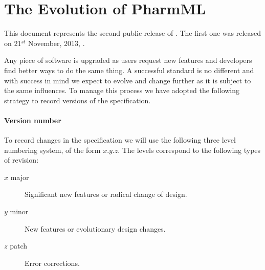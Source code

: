

\section{The Evolution of PharmML}
	
This document represents the second public release of \pharmml. The first one was released  
on 21$^{st}$ November, 2013, \cite{Pharmml_021}.

Any piece of software is upgraded as users request new features and developers find better 
ways to do the same thing. A successful standard is no different and with success in mind we 
expect \pharmml to evolve and change further as it is subject to the same influences. To manage this 
process we have adopted the following strategy to record versions of the \pharmml specification.

\paragraph{Version number}
\label{intro:versioning}

To record changes in the specification we will use the following three level numbering system, of the form
$x.y.z$. The levels correspond to the following types of revision:

\begin{description}
\item[$x$ major] Significant new features or radical change of design.
\item[$y$ minor] New features or evolutionary design changes.
\item[$z$ patch] Error corrections.
\end{description}


